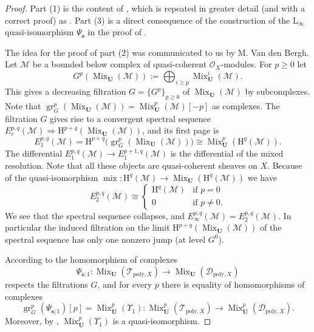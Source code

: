 \documentclass[a4paper, 10pt]{amsart}
\theoremstyle{definition}
\numberwithin{equation}{section}
\newcommand{\opn}{\operatorname}
\newcommand{\mcal}[1]{\mathcal{#1}}
\newcommand{\mrm}[1]{\mathrm{#1}}
\newcommand{\bsym}[1]{\boldsymbol{#1}}
\newcommand{\boplus}{\bigoplus\nolimits}
\begin{document}
\begin{proof}
Part (1) is the content of \cite[Theorem 0.2]{Ye1}, which is repeated in
greater detail (and with a correct proof) as \cite[Erratum, Theorem 1.2]{Ye1}.
Part (3) is a direct consequence of the construction of the 
 $\mrm{L}_{\infty}$ quasi-isomorphism $\Psi_{\bsym{s}}$
in the proof of \cite[Erratum, Theorem 1.2]{Ye1}.

The idea for the proof of part (2) was communicated to us by M. Van den Bergh.
Let $\mcal{M}$ be a bounded below complex of quasi-coherent
$\mcal{O}_X$-modules. For $p \geq 0$ let
\[ G^p (\opn{Mix}_{\bsym{U}}(\mcal{M})) :=
\boplus_{i \geq p} \opn{Mix}^i_{\bsym{U}}(\mcal{M}) . \]
This gives a decreasing filtration $G = \{ G^p \}_{p \geq 0}$
of $\opn{Mix}_{\bsym{U}}(\mcal{M})$
by subcomplexes. Note that 
$\opn{gr}_G^p (\opn{Mix}_{\bsym{U}}(\mcal{M})) = 
\opn{Mix}^p_{\bsym{U}}(\mcal{M})[-p]$
as complexes. 
The filtration $G$ gives rise to a convergent spectral sequence
$E_r^{p, q}(\mcal{M}) \Rightarrow 
\mrm{H}^{p+q} (\opn{Mix}_{\bsym{U}}(\mcal{M}))$,
and its first page is
\[ E_1^{p, q}(\mcal{M}) =
\mrm{H}^{p+q} \bigl( \opn{gr}_G^p (\opn{Mix}_{\bsym{U}}(\mcal{M})) \bigr)
\cong \opn{Mix}^p_{\bsym{U}}(\mrm{H}^q (\mcal{M})) . \]
The differential 
$E_1^{p, q}(\mcal{M}) \to E_1^{p+1, q}(\mcal{M})$
is the differential of the mixed resolution. 
Note that all these objects are quasi-coherent sheaves on $X$. 
Because of the quasi-isomorphism 
$\opn{mix} :   \mrm{H}^q (\mcal{M}) \to
\opn{Mix}_{\bsym{U}}(\mrm{H}^q (\mcal{M}))$
we have 
\begin{equation} \label{eqn:33}
E_2^{p, q}(\mcal{M}) \cong
\begin{cases}
\mrm{H}^q (\mcal{M}) & \text{if } p = 0 \\
0 & \text{if } p \neq 0 . 
\end{cases} 
\end{equation}
We see that the spectral sequence collapses, and 
$E_{\infty}^{p, q}(\mcal{M}) = E_2^{p, q}(\mcal{M})$.
In particular the induced filtration on the limit 
$\mrm{H}^{p+q} (\opn{Mix}_{\bsym{U}}(\mcal{M}))$
of the spectral sequence has only one nonzero jump (at level $G^0$).

According to \cite[Erratum, Theorem 1.2]{Ye1} the homomorphism of complexes
\[ \Psi_{\bsym{s}; 1} :
\opn{Mix}_{\bsym{U}}(\mcal{T}_{\mrm{poly}, X}) \to 
\opn{Mix}_{\bsym{U}}(\mcal{D}_{\mrm{poly}, X}) \]
respects the filtrations $G$, and for every $p$ there is equality
of homomorphisms of complexes
\begin{equation} \label{eqn:34}
\opn{gr}^p_G(\Psi_{\bsym{s}; 1})[p] = \opn{Mix}^p_{\bsym{U}}(\Upsilon_1) :
\opn{Mix}^p_{\bsym{U}}(\mcal{T}_{\mrm{poly}, X}) \to 
\opn{Mix}^p_{\bsym{U}}(\mcal{D}_{\mrm{poly}, X}) .
\end{equation}
Moreover, by \cite[Theorem 4.17]{Ye3}, 
$\opn{Mix}^p_{\bsym{U}}(\Upsilon_1)$ is a quasi-isomorphism.


\end{proof}
\end{document}
